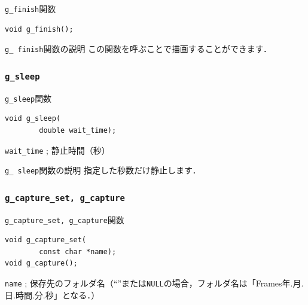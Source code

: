 \documentclass[platex,a4paper,12pt]{jsarticle}%
\begin{document}
\begin{itembox}[l]{\texttt{g\_finish}関数}
\begin{verbatim}
void g_finish();
\end{verbatim}
\end{itembox}

\begin{itembox}[l]{\texttt{g\_ finish}関数の説明}
この関数を呼ぶことで描画することができます．
\end{itembox}


\subsubsection{\texttt{g\_sleep}}

\begin{itembox}[l]{\texttt{g\_sleep}関数}
\begin{verbatim}
void g_sleep(
        double wait_time);
\end{verbatim}
\verb|wait_time| ; 静止時間（秒）
\end{itembox}

\begin{itembox}[l]{\texttt{g\_ sleep}関数の説明}
指定した秒数だけ静止します．
\end{itembox}




\clearpage
\subsubsection{\texttt{g\_capture\_set, g\_capture}}

\begin{itembox}[l]{\texttt{g\_capture\_set, g\_capture}関数}
\begin{verbatim}
void g_capture_set(
        const char *name);
void g_capture();
\end{verbatim}
\verb|name| ; 保存先のフォルダ名（``''または\verb|NULL|の場合，フォルダ名は「Frames年.月.日.時間.分.秒」となる．）
\end{itembox}
\end{document}

